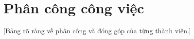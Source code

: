 \section{Phân công công việc}
\label{sec:task_assignment}

[Bảng rõ ràng về phân công và đóng góp của từng thành viên.]
